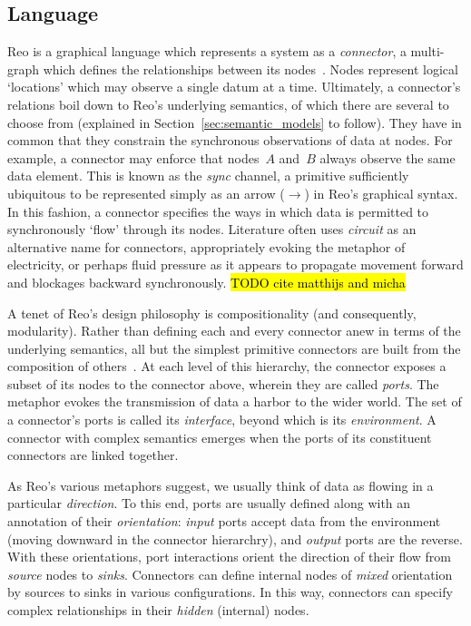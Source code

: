 \subsection{Language}
\label{sec:reo_lang}
Reo is a graphical language which represents a system as a \textit{connector}, a multi-graph which defines the relationships between its nodes~\cite{arbab2011puff}. Nodes represent logical `locations' which may observe a single datum at a time. Ultimately, a connector's relations boil down to Reo's underlying semantics, of which there are several to choose from (explained in Section~\ref{sec:semantic_models} to follow). They have in common that they constrain the synchronous observations of data at nodes. For example, a connector may enforce that nodes~$A$ and~$B$ always observe the same data element. This is known as the \textit{sync} channel, a primitive sufficiently ubiquitous to be represented simply as an arrow ($\longrightarrow$) in Reo's graphical syntax. In this fashion, a connector specifies the ways in which data is permitted to synchronously `flow' through its 	nodes. Literature often uses \textit{circuit} as an alternative name for connectors, appropriately evoking the metaphor of electricity, or perhaps fluid pressure as it appears to propagate movement forward and blockages backward synchronously.
\hl{TODO cite matthijs and micha} 

A tenet of Reo's design philosophy is compositionality (and consequently, modularity). Rather than defining each and every connector anew in terms of the underlying semantics, all but the simplest primitive connectors are built from the composition of others~\cite{arbab2011puff}. At each level of this hierarchy, the connector exposes a subset of its nodes to the connector above, wherein they are called \textit{ports}. The metaphor evokes the transmission of data a harbor to the wider world. The set of a connector's ports is called its \textit{interface}, beyond which is its \textit{environment}. A connector with complex semantics emerges when the ports of its constituent connectors are linked together.

As Reo's various metaphors suggest, we usually think of data as flowing in a particular \textit{direction}. To this end, ports are usually defined along with an annotation of their \textit{orientation}: \textit{input} ports accept data from the environment (moving downward in the connector hierarchry), and \textit{output} ports are the reverse. With these orientations, port interactions orient the direction of their flow from \textit{source} nodes to \textit{sinks}. Connectors can define internal nodes of \textit{mixed} orientation by sources to sinks in various configurations. In this way, connectors can specify complex relationships in their \textit{hidden} (internal) nodes.

